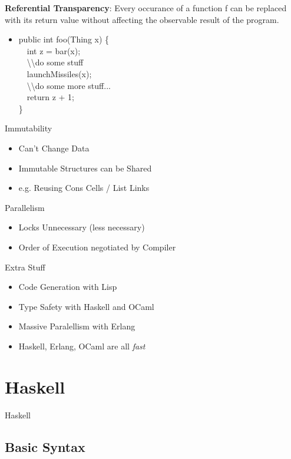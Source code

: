 \documentclass{beamer}                  %
\newcommand{\srule}{
	\rule{\textwidth}{1pt}\\
}
\newlength{\subsecwidth}
\newenvironment{slide}{
	\begin{frame} %
	\settowidth{\subsecwidth}{\insertsubsection} %
	\ifthenelse{\dimtest{\subsecwidth}{<}{1pt}}{ %
		\frametitle{\insertsection\\             %
		\vspace{-1ex}                            %
		\color{fore}\srule                       %
		\par                                     %
		\vspace{-3ex}                            %
		}
	}{                                           %
		\frametitle{\insertsection\ -- \insertsubsection\\ %
		\vspace{-1ex}                            %
		\color{fore}\srule                       %
		\par                                     %
		\vspace{-3ex}                            %
		}
	}
	\Large                                       %
}{
	\end{frame}
}
\newcommand{\titleslide}[1]{
	\section{#1}             %
	\begin{slide}
		\begin{center}
			\color{comments}
			\Huge            %
			#1               %
		\end{center}
	\end{slide}
}
\begin{document}
\begin{slide}
  \textbf{Referential Transparency}:
  Every occurance of a function f can be replaced with its return value without affecting the observable result of the program.
  \begin{itemize}
    \item public int foo(Thing x) \{\\
  ~~int z = bar(x);\\
  ~~\textbackslash\textbackslash do some stuff\\
  ~~launchMissiles(x);\\
  ~~\textbackslash\textbackslash do some more stuff...\\
  ~~return z + 1;\\
  \}
  \end{itemize}
\end{slide}

\begin{slide}
  Immutability
  \begin{itemize}
    \item Can't Change Data
    \item Immutable Structures can be Shared
    \item e.g. Reusing Cons Cells / List Links
  \end{itemize}
\end{slide}

\begin{slide}
  Parallelism
  \begin{itemize}
    \item Locks Unnecessary (less necessary)
    \item Order of Execution negotiated by Compiler
  \end{itemize}
\end{slide}

\begin{slide}
  Extra Stuff
  \begin{itemize}
    \item Code Generation with Lisp
    \item Type Safety with Haskell and OCaml
    \item Massive Paralellism with Erlang
    \item Haskell, Erlang, OCaml are all \textit{fast}
  \end{itemize}
\end{slide}


\titleslide{Haskell}

\subsection{Basic Syntax}
\end{document}
